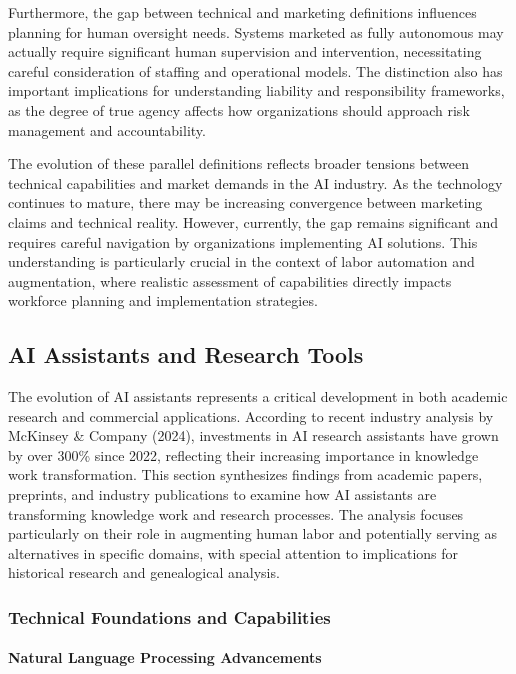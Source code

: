 \documentclass[
]{article}
\begin{document}
Furthermore, the gap between technical and marketing definitions
influences planning for human oversight needs. Systems marketed as fully
autonomous may actually require significant human supervision and
intervention, necessitating careful consideration of staffing and
operational models. The distinction also has important implications for
understanding liability and responsibility frameworks, as the degree of
true agency affects how organizations should approach risk management
and accountability.

The evolution of these parallel definitions reflects broader tensions
between technical capabilities and market demands in the AI industry. As
the technology continues to mature, there may be increasing convergence
between marketing claims and technical reality. However, currently, the
gap remains significant and requires careful navigation by organizations
implementing AI solutions. This understanding is particularly crucial in
the context of labor automation and augmentation, where realistic
assessment of capabilities directly impacts workforce planning and
implementation strategies.

\subsection{AI Assistants and Research
Tools}\label{ai-assistants-and-research-tools}

The evolution of AI assistants represents a critical development in both
academic research and commercial applications. According to recent
industry analysis by McKinsey \& Company (2024), investments in AI
research assistants have grown by over 300\% since 2022, reflecting
their increasing importance in knowledge work transformation. This
section synthesizes findings from academic papers, preprints, and
industry publications to examine how AI assistants are transforming
knowledge work and research processes. The analysis focuses particularly
on their role in augmenting human labor and potentially serving as
alternatives in specific domains, with special attention to implications
for historical research and genealogical analysis.

\subsubsection{Technical Foundations and
Capabilities}\label{technical-foundations-and-capabilities}

\paragraph{Natural Language Processing
Advancements}\label{natural-language-processing-advancements}
\end{document}
